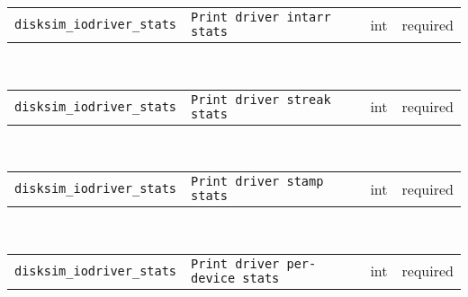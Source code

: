 \noindent 
\begin{tabular}{|p{\lpmodwidth}|p{\lpnamewidth}|p{0.5in}|p{0.5in}|}
\cline{1-4}
\texttt{disksim\_iodriver\_stats} & \texttt{Print driver intarr stats} & int & required \\ 
\cline{1-4}
\end{tabular}\\ 
\noindent 
\begin{tabular}{|p{\lpmodwidth}|p{\lpnamewidth}|p{0.5in}|p{0.5in}|}
\cline{1-4}
\texttt{disksim\_iodriver\_stats} & \texttt{Print driver streak stats} & int & required \\ 
\cline{1-4}
\end{tabular}\\ 
\noindent 
\begin{tabular}{|p{\lpmodwidth}|p{\lpnamewidth}|p{0.5in}|p{0.5in}|}
\cline{1-4}
\texttt{disksim\_iodriver\_stats} & \texttt{Print driver stamp stats} & int & required \\ 
\cline{1-4}
\end{tabular}\\ 
\noindent 
\begin{tabular}{|p{\lpmodwidth}|p{\lpnamewidth}|p{0.5in}|p{0.5in}|}
\cline{1-4}
\texttt{disksim\_iodriver\_stats} & \texttt{Print driver per-device stats} & int & required \\ 
\cline{1-4}
\end{tabular}\\ 
